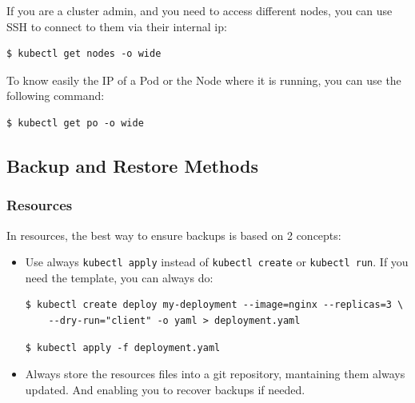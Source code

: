 \documentclass{article}
\newenvironment{blocktemplateI}[1]{%
    \tcolorbox[beamer,%
    noparskip,breakable,
    colframe=Violet,%
    colbacklower=Black,%
    title=#1]}%
    {\endtcolorbox}
\newenvironment{blocktemplateII}[1]{%
    \tcolorbox[beamer,%
    noparskip,breakable,
    colframe=Green,%
    colbacklower=LimeGreen!75!LightGreen,%
    title=#1]}%
    {\endtcolorbox}
\newenvironment{codetemplate}[1][]{%
  \mybasecolorbox[#1]
  \itshape
}{%
  \endmybasecolorbox
}
\begin{document}
\begin{blocktemplateII}{NOTE}
If you are a cluster admin, and you need to access different nodes, you can use SSH to connect to them via their internal ip:
\begin{codetemplate}{}
\begin{verbatim}
$ kubectl get nodes -o wide
\end{verbatim}
\end{codetemplate}
\end{blocktemplateII}

\begin{blocktemplateI}{NOTE}
To know easily the IP of a Pod or the Node where it is running, you can use the following command:
\begin{codetemplate}{}
\begin{verbatim}
$ kubectl get po -o wide
\end{verbatim}
\end{codetemplate}
\end{blocktemplateI}

\subsection{Backup and Restore Methods}
\subsubsection{Resources}
In resources, the best way to ensure backups is based on 2 concepts:
\begin{itemize}
    \item Use always \verb|kubectl apply| instead of \verb|kubectl create| or \verb|kubectl run|. If you need the template, you can always do:
\begin{codetemplate}{}
\begin{verbatim}
$ kubectl create deploy my-deployment --image=nginx --replicas=3 \
    --dry-run="client" -o yaml > deployment.yaml
\end{verbatim}
\end{codetemplate}
\begin{codetemplate}{}
\begin{verbatim}
$ kubectl apply -f deployment.yaml
\end{verbatim}
\end{codetemplate}

    \item Always store the resources files into a git repository, mantaining them always updated. And enabling you to recover backups if needed.
\end{itemize}
\end{document}
